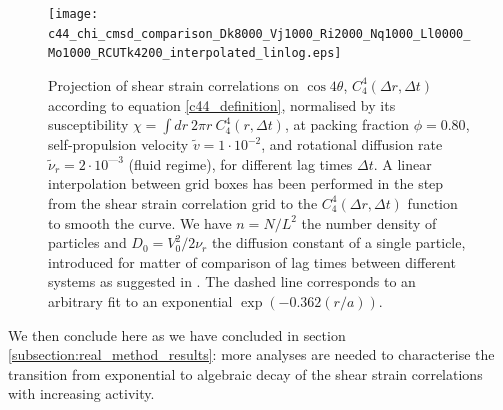 \documentclass[class=report, float=false, crop=false]{standalone}
\begin{document}
\begin{figure}[H]
\centering
\texttt{[image: c44\_chi\_cmsd\_comparison\_Dk8000\_Vj1000\_Ri2000\_Nq1000\_Ll0000\_Mo1000\_RCUTk4200\_interpolated\_linlog.eps]}
\caption{Projection of shear strain correlations on $\cos4\theta$, $C_4^4(\Delta r, \Delta t)$ according to equation \ref{c44_definition}, normalised by its susceptibility $\chi = \int dr~ 2 \pi r~ C_4^4(r, \Delta t)$, at packing fraction $\phi = 0.80$, self-propulsion velocity $\tilde{v} = 1\cdot10^{-2}$, and rotational diffusion rate $\tilde{\nu}_r = 2\cdot10^{—3}$ (fluid regime), for different lag times $\Delta t$. A linear interpolation between grid boxes has been performed in the step from the shear strain correlation grid to the $C_4^4(\Delta r, \Delta t)$ function to smooth the curve. We have $n = N/L^2$ the number density of particles and $D_0 = V_0^2/2\nu_r$ the diffusion constant of a single particle, introduced for matter of comparison of lag times between different systems as suggested in \cite{illing2016strain}. The dashed line corresponds to an arbitrary fit to an exponential $\exp(-0.362(r/a))$.}
\label{c44_cmsd_low}
\end{figure}

We then conclude here as we have concluded in section \ref{subsection:real_method_results}: more analyses are needed to characterise the transition from exponential to algebraic decay of the shear strain correlations with increasing activity.
\end{document}
